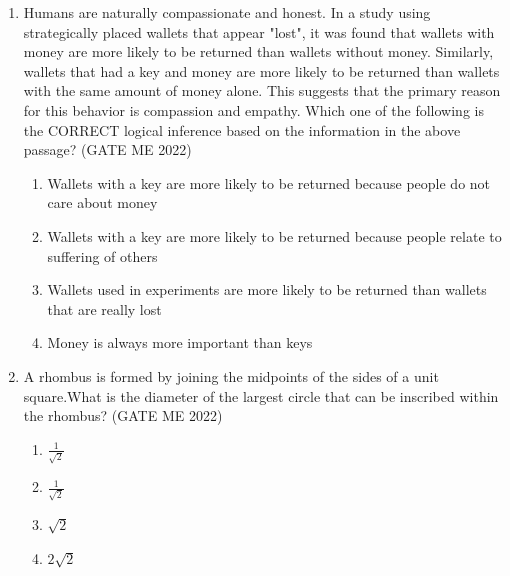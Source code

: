 \documentclass[journal]{IEEEtran}
\numberwithin{equation}{enumi}
\numberwithin{figure}{enumi}
\begin{document}
\begin{enumerate}
\item Humans are naturally compassionate and honest. In a study using strategically placed wallets that appear "lost", it was found that wallets with money are more likely to be returned than wallets without money. Similarly, wallets that had a key and money are more likely to be returned than wallets with the same amount of money alone. This suggests that the primary reason for this behavior is compassion and empathy. Which one of the following is the CORRECT logical inference based on the information in the above passage?
\hfill{(GATE ME 2022)}
\begin{enumerate}   
\item Wallets with a key are more likely to be returned because people do not care about money
\item Wallets with a key are more likely to be returned because people relate to suffering of others
\item Wallets used in experiments are more likely to be returned than wallets that are really lost
\item Money is always more important than keys
\end{enumerate}
\item A rhombus is formed by joining the midpoints of the sides of a unit square.What is the diameter of the largest circle that can be inscribed within the rhombus?
\hfill{(GATE ME 2022)}
\begin{multicols}{4}
    \begin{enumerate}
        \item $\frac{1}{\sqrt{2}}$
        \item $\frac{1}{\sqrt{2}}$
        \item $\sqrt{2}$
        \item $2\sqrt{2}$
    \end{enumerate}
\end{multicols}


\end{enumerate}
\end{document}
